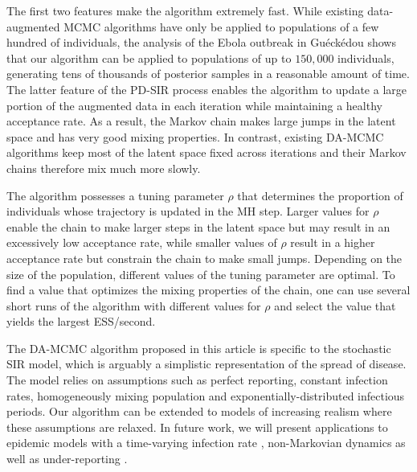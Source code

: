 \documentclass[11pt]{article}
\begin{document}
	The first two features make the algorithm extremely fast. While existing data-augmented MCMC algorithms have only be applied to populations of a few hundred of individuals, the analysis of the Ebola outbreak in Gu\'eck\'edou shows that our algorithm can be applied to populations of up to $150,000$ individuals, generating tens of thousands of posterior samples in a reasonable amount of time.	
	The latter feature of the PD-SIR process enables the algorithm to update a large portion of the augmented data in each iteration while maintaining a healthy acceptance rate. As a result, the Markov chain makes large jumps in the latent space and has very good mixing properties. In contrast, existing DA-MCMC algorithms keep most of the latent space fixed across iterations \cite{Gibson.1998, ONeill.1999, Fintzi.2017} and their Markov chains therefore mix much more slowly.
	
	The algorithm possesses a tuning parameter $\rho$ that determines the proportion of individuals whose trajectory is updated in the MH step. Larger values for $\rho$ enable the chain to make larger steps in the latent space but may result in an excessively low acceptance rate, while smaller values of $\rho$ result in a higher acceptance rate but constrain the chain to make small jumps. Depending on the size of the population, different values of the tuning parameter are optimal. To find a value that optimizes the mixing properties of the chain, one can use several short runs of the algorithm with different values for $\rho$ and select the value that yields the largest ESS/second. %
	
	
	The DA-MCMC algorithm proposed  in this article  is specific to  the stochastic SIR model, which is arguably a simplistic representation of the spread of disease. The model relies on assumptions such as perfect reporting, constant infection rates, homogeneously mixing population and exponentially-distributed infectious periods. Our algorithm can be extended to models of increasing realism where these assumptions are relaxed. In future work, we will present applications to epidemic models with a time-varying infection rate \cite{Kypraios.2018}, non-Markovian dynamics \cite{Streftaris.2002} as well as under-reporting \cite{Fintzi.2017}.
	
\end{document}
